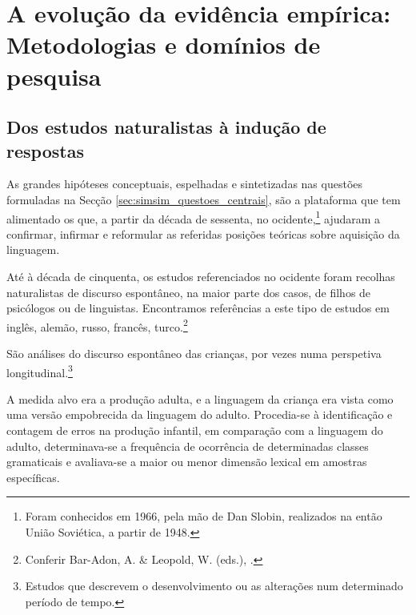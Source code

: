 \documentclass[output=paper]{LSP/langsci}
\begin{document}
\section{A evolução da evidência empírica: Metodologias e domínios de pesquisa}
\label{sec:simsim_evolucao}

\subsection{Dos estudos naturalistas à indução de respostas}
\label{subsec:simsim_estudos}

As grandes hipóteses conceptuais, espelhadas e sintetizadas nas questões formuladas na Secção  \ref{sec:simsim_questoes_centrais}, são a plataforma que tem alimentado os  que, a partir da década de sessenta, no ocidente,\footnote{Foram conhecidos em 1966, pela mão de Dan Slobin,  realizados na então União Soviética, a partir de 1948.} ajudaram a confirmar, infirmar e reformular as referidas posições teóricas sobre aquisição da linguagem. 

Até à década de cinquenta, os estudos referenciados no ocidente foram recolhas naturalistas de discurso espontâneo, na maior parte dos casos, de filhos de psicólogos ou de linguistas. Encontramos referências a este tipo de estudos em inglês, alemão, russo, francês, turco.\footnote{Conferir Bar-Adon, A. \& Leopold, W. (eds.), \citeyear{baradonleopold1971}.}

São análises do discurso espontâneo das crianças, por vezes numa perspetiva longitudinal.\footnote{Estudos que descrevem o desenvolvimento ou as alterações num determinado período de tempo.}

A medida alvo era a produção adulta, e a linguagem da criança era vista como uma versão empobrecida da linguagem do adulto. Procedia-se à identificação e contagem de erros na produção infantil, em comparação com a linguagem do adulto, determinava-se a frequência de ocorrência de determinadas classes gramaticais e avaliava-se a maior ou menor dimensão lexical em amostras específicas.
\end{document}
